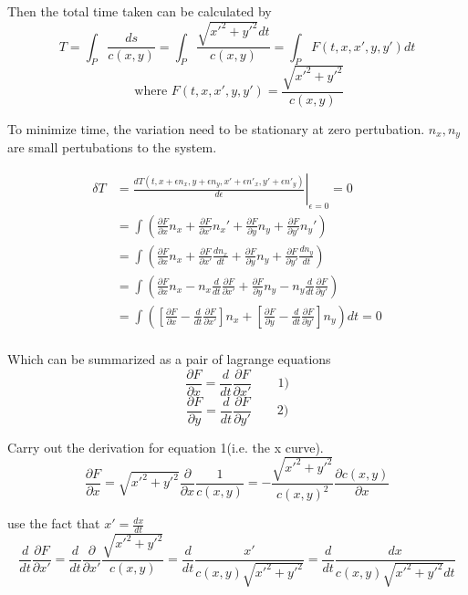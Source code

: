 \documentclass[%
 preprint,
 amsmath,amssymb,
 aps,
 pra,
 fleqn
]{revtex4-2}
\begin{document}
Then the total time taken can be calculated by
$$T = \int_P \frac{ds}{c(x,y)} = \int_P \frac{\sqrt{x'^2+y'^2}dt}{c(x,y)} = \int_PF(t,x,x',y,y')dt$$
$$\text{ where }F(t,x,x',y,y') = \frac{\sqrt{x'^2+y'^2}}{c(x,y)}$$

To minimize time, the variation need to be stationary at zero pertubation. $n_x,n_y$ are small pertubations to the system.
\begin{ceqn}
    \begin{align*}
        \delta T &= \left.\frac{d T(t,x+\epsilon n_x, y+\epsilon n_y,x'+\epsilon n'_x,y'+\epsilon n'_y)}{d\epsilon}\right|_{\epsilon=0} = 0\\
        &= \int \left(\frac{\partial F}{\partial x}n_x + \frac{\partial F}{\partial x'}n_x' + \frac{\partial F}{\partial y}n_y + \frac{\partial F}{\partial y'}n_y'\right)\\
        &= \int \left(\frac{\partial F}{\partial x}n_x + \frac{\partial F}{\partial x'}\frac{d n_x}{dt} + \frac{\partial F}{\partial y}n_y + \frac{\partial F}{\partial y'}\frac{d n_y}{dt}\right)\\
        &= \int \left(\frac{\partial F}{\partial x}n_x - n_x\frac{d}{dt}\frac{\partial F}{\partial x'} + \frac{\partial F}{\partial y}n_y - n_y\frac{d}{dt}\frac{\partial F}{\partial y'}\right)\\
        &= \int \left(\left[\frac{\partial F}{\partial x} - \frac{d}{dt}\frac{\partial F}{\partial x'}\right]n_x + \left[\frac{\partial F}{\partial y} - \frac{d}{dt}\frac{\partial F}{\partial y'}\right]n_y\right)dt = 0\\
    \end{align*}
\end{ceqn}

Which can be summarized as a pair of lagrange equations
$$\frac{\partial F}{\partial x} = \frac{d}{d t}\frac{\partial F}{\partial x'} \qquad 1)$$
$$\frac{\partial F}{\partial y} = \frac{d}{d t}\frac{\partial F}{\partial y'}\qquad 2)$$

Carry out the derivation for equation 1(i.e. the x curve).
$$\frac{\partial F}{\partial x} = \sqrt{x'^2+y'^2}\frac{\partial}{\partial x}\frac{1}{c(x,y)} = -\frac{\sqrt{x'^2+y'^2}}{c(x,y)^2}\frac{\partial c(x,y)}{\partial x}$$

use the fact that $x' = \frac{dx}{dt}$
$$\frac{d}{d t} \frac{\partial F}{\partial x'} = \frac{d}{dt} \frac{\partial}{\partial x'}\frac{\sqrt{x'^2+y'^2}}{c(x,y)} = \frac{d}{dt} \frac{x'}{c(x,y)\sqrt{x'^2+y'^2}} = \frac{d}{dt} \frac{dx}{c(x,y)\sqrt{x'^2+y'^2}dt}$$
\end{document}
